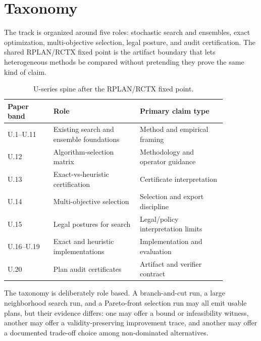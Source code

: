 \section{Taxonomy}

The track is organized around five roles: stochastic search and ensembles,
exact optimization, multi-objective selection, legal posture, and audit
certification. The shared RPLAN/RCTX fixed point is the artifact boundary that
lets heterogeneous methods be compared without pretending they prove the same
kind of claim.

\begin{table}[htbp]
\centering
\small
\begin{tabular}{p{0.18\linewidth}p{0.34\linewidth}p{0.34\linewidth}}
\toprule
Paper band & Role & Primary claim type \\
\midrule
U.1--U.11 & Existing search and ensemble foundations & Method and empirical framing \\
U.12 & Algorithm-selection matrix & Methodology and operator guidance \\
U.13 & Exact-vs-heuristic certification & Certificate interpretation \\
U.14 & Multi-objective selection & Selection and export discipline \\
U.15 & Legal postures for search & Legal/policy interpretation limits \\
U.16--U.19 & Exact and heuristic implementations & Implementation and evaluation \\
U.20 & Plan audit certificates & Artifact and verifier contract \\
\bottomrule
\end{tabular}
\caption{U-series spine after the RPLAN/RCTX fixed point.}
\end{table}

The taxonomy is deliberately role based. A branch-and-cut run, a large
neighborhood search run, and a Pareto-front selection run may all emit usable
plans, but their evidence differs: one may offer a bound or infeasibility
witness, another may offer a validity-preserving improvement trace, and another
may offer a documented trade-off choice among non-dominated alternatives.
